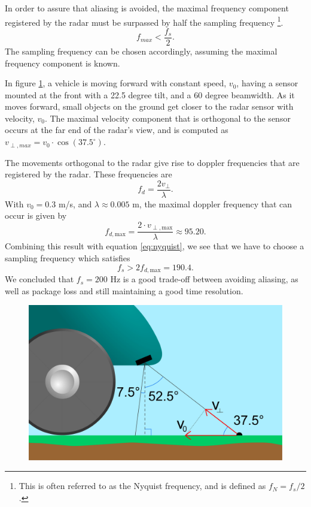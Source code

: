 In order to assure that aliasing is avoided, the maximal frequency component registered by the radar must be surpassed by half the sampling frequency \footnote{This is often referred to as the Nyquist frequency, and is defined as $f_N=f_s/2$.}.
\begin{equation}
\label{eq:nyquist}
	f_{max} < \frac{f_s}2.
\end{equation}
The sampling frequency can be chosen accordingly, assuming the maximal frequency component is known. 

In figure \ref{fig:sensor_placement}, a vehicle is moving forward with constant speed, $v_0$, having a sensor mounted at the front with a 22.5 degree tilt, and a 60 degree beamwidth. As it moves forward, small objects on the ground get closer to the radar sensor with velocity, $v_0$. The maximal velocity component that is orthogonal to the sensor occurs at the far end of the radar's view, and is computed as $v_{\perp, max} = v_0\cdot \cos(37.5^\circ)$.

The movements orthogonal to the radar give rise to doppler frequencies that are registered by the radar. These frequencies are \citep{lien_gillian_karagozler_amihood_schwesig_olson_raja_poupyrev_2016}
\begin{equation}
	f_{d} = \frac{2v_\perp}{\lambda}.
\end{equation}
With $v_0=0.3$ m/s, and $\lambda \approx 0.005$ m, the maximal doppler frequency that can occur is given by 
\begin{equation}
	f_{d,\textrm{max}} = \frac{2\cdot v_{\perp, \textrm{max}}}{\lambda} \approx 95.20.
\end{equation}
Combining this result with equation \eqref{eq:nyquist}, we see that we have to choose a sampling frequency which satisfies
\begin{equation}
	f_s > 2f_{d,\textrm{max}} = 190.4.
\end{equation}
We concluded that $f_s=200$ Hz is a good trade-off between avoiding aliasing, as well as package loss and still maintaining a good time resolution.

\begin{figure}[h]
	\centering
	\includegraphics[scale=0.30]{figs_temp/sensor_placement.jpg}
	\caption{}
	\label{fig:sensor_placement}
\end{figure}

